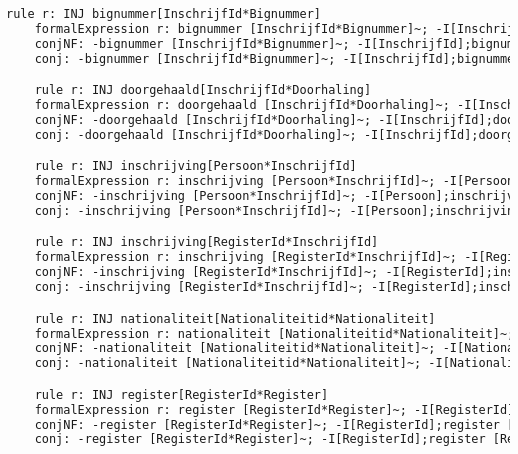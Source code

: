 \begin{lstlisting}[language=TeX]
    rule r: INJ bignummer[InschrijfId*Bignummer]
    formalExpression r: bignummer [InschrijfId*Bignummer]~; -I[InschrijfId];bignummer [InschrijfId*Bignummer] |- -I[Bignummer]
    conjNF: -bignummer [InschrijfId*Bignummer]~; -I[InschrijfId];bignummer [InschrijfId*Bignummer]\/ -I[Bignummer]
    conj: -bignummer [InschrijfId*Bignummer]~; -I[InschrijfId];bignummer [InschrijfId*Bignummer]\/ -I[Bignummer]

    rule r: INJ doorgehaald[InschrijfId*Doorhaling]
    formalExpression r: doorgehaald [InschrijfId*Doorhaling]~; -I[InschrijfId];doorgehaald [InschrijfId*Doorhaling] |- -I[Doorhaling]
    conjNF: -doorgehaald [InschrijfId*Doorhaling]~; -I[InschrijfId];doorgehaald [InschrijfId*Doorhaling]\/ -I[Doorhaling]
    conj: -doorgehaald [InschrijfId*Doorhaling]~; -I[InschrijfId];doorgehaald [InschrijfId*Doorhaling]\/ -I[Doorhaling]

    rule r: INJ inschrijving[Persoon*InschrijfId]
    formalExpression r: inschrijving [Persoon*InschrijfId]~; -I[Persoon];inschrijving [Persoon*InschrijfId] |- -I[InschrijfId]
    conjNF: -inschrijving [Persoon*InschrijfId]~; -I[Persoon];inschrijving [Persoon*InschrijfId]\/ -I[InschrijfId]
    conj: -inschrijving [Persoon*InschrijfId]~; -I[Persoon];inschrijving [Persoon*InschrijfId]\/ -I[InschrijfId]

    rule r: INJ inschrijving[RegisterId*InschrijfId]
    formalExpression r: inschrijving [RegisterId*InschrijfId]~; -I[RegisterId];inschrijving [RegisterId*InschrijfId] |- -I[InschrijfId]
    conjNF: -inschrijving [RegisterId*InschrijfId]~; -I[RegisterId];inschrijving [RegisterId*InschrijfId]\/ -I[InschrijfId]
    conj: -inschrijving [RegisterId*InschrijfId]~; -I[RegisterId];inschrijving [RegisterId*InschrijfId]\/ -I[InschrijfId]

    rule r: INJ nationaliteit[Nationaliteitid*Nationaliteit]
    formalExpression r: nationaliteit [Nationaliteitid*Nationaliteit]~; -I[Nationaliteitid];nationaliteit [Nationaliteitid*Nationaliteit] |- -I[Nationaliteit]
    conjNF: -nationaliteit [Nationaliteitid*Nationaliteit]~; -I[Nationaliteitid];nationaliteit [Nationaliteitid*Nationaliteit]\/ -I[Nationaliteit]
    conj: -nationaliteit [Nationaliteitid*Nationaliteit]~; -I[Nationaliteitid];nationaliteit [Nationaliteitid*Nationaliteit]\/ -I[Nationaliteit]

    rule r: INJ register[RegisterId*Register]
    formalExpression r: register [RegisterId*Register]~; -I[RegisterId];register [RegisterId*Register] |- -I[Register]
    conjNF: -register [RegisterId*Register]~; -I[RegisterId];register [RegisterId*Register]\/ -I[Register]
    conj: -register [RegisterId*Register]~; -I[RegisterId];register [RegisterId*Register]\/ -I[Register]


\end{lstlisting}
